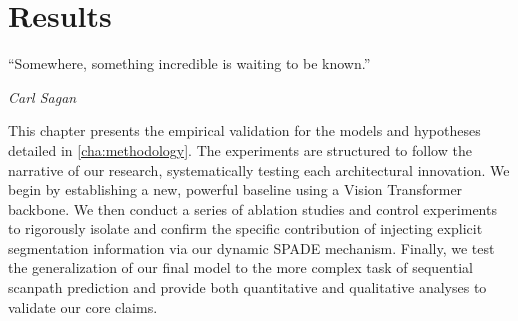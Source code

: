 \chapter{Results}
\label{c:results}

\epigraph{\enquote{Somewhere, something incredible is waiting to be known.}}{\emph{Carl Sagan}}
This chapter presents the empirical validation for the models and hypotheses detailed in \cref{cha:methodology}. The experiments are structured to follow the narrative of our research, systematically testing each architectural innovation. We begin by establishing a new, powerful baseline using a Vision Transformer backbone. We then conduct a series of ablation studies and control experiments to rigorously isolate and confirm the specific contribution of injecting explicit segmentation information via our dynamic SPADE mechanism. Finally, we test the generalization of our final model to the more complex task of sequential scanpath prediction and provide both quantitative and qualitative analyses to validate our core claims.






